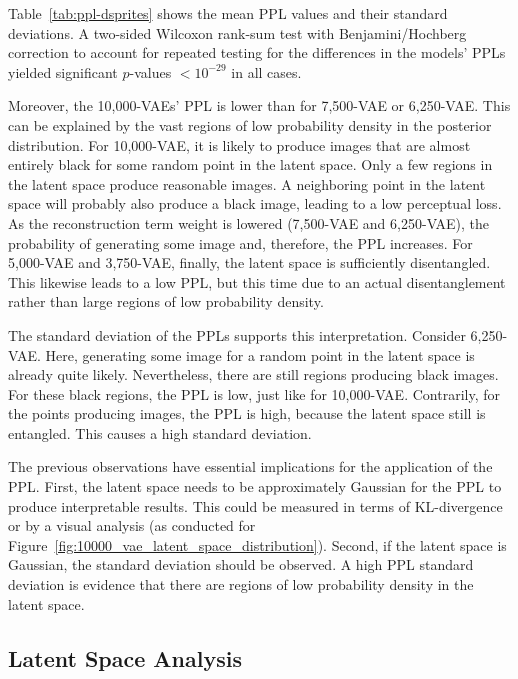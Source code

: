 Table~\ref{tab:ppl-dsprites} shows the mean \ac{PPL} values and their standard deviations.
A two-sided Wilcoxon rank-sum test with Benjamini/Hochberg correction to account for repeated testing for the differences in the models' \acp{PPL} yielded significant $p$-values $< 10^{-29}$ in all cases.

Moreover, the 10,000-\ac{VAE}s' \ac{PPL} is lower than for 7,500-\ac{VAE} or 6,250-\ac{VAE}.
This can be explained by the vast regions of low probability density in the posterior distribution.
For 10,000-\ac{VAE}, it is likely to produce images that are almost entirely black for some random point in the latent space.
Only a few regions in the latent space produce reasonable images.
A neighboring point in the latent space will probably also produce a black image, leading to a low perceptual loss.
As the reconstruction term weight is lowered (7,500-\ac{VAE} and 6,250-\ac{VAE}), the probability of generating some image and, therefore, the \ac{PPL} increases.
For 5,000-\ac{VAE} and 3,750-\ac{VAE}, finally, the latent space is sufficiently disentangled.
This likewise leads to a low \ac{PPL}, but this time due to an actual disentanglement rather than large regions of low probability density.

The standard deviation of the \acp{PPL} supports this interpretation.
Consider 6,250-\ac{VAE}.
Here, generating some image for a random point in the latent space is already quite likely.
Nevertheless, there are still  regions producing black images.
For these black regions, the \ac{PPL} is low, just like for 10,000-\ac{VAE}.
Contrarily, for the points producing images, the \ac{PPL} is high, because the latent space still is entangled.
This causes a high standard deviation.

The previous observations have essential implications for the application of the \ac{PPL}.
First, the latent space needs to be approximately Gaussian for the \ac{PPL} to produce interpretable results.
This could be measured in terms of \ac{KL-divergence} or by a visual analysis (as conducted for Figure~\ref{fig:10000_vae_latent_space_distribution}).
Second, if the latent space is Gaussian, the standard deviation should be observed.
A high \ac{PPL} standard deviation is evidence that there are regions of low probability density in the latent space.

\subsection{Latent Space Analysis}\label{subsec:model-generated-samples}

